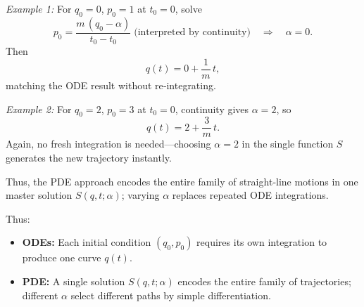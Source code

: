 \emph{Example 1:} For \(q_{0}=0\), \(p_{0}=1\) at \(t_{0}=0\), solve
\[
p_{0} = \frac{m\,(q_{0} - \alpha)}{t_{0}-t_{0}}
\;\text{(interpreted by continuity)}\quad\Longrightarrow\quad
\alpha = 0.
\]
Then
\[
q(t) = 0 + \frac{1}{m}\,t,
\]
matching the ODE result without re‐integrating.

\emph{Example 2:} For \(q_{0}=2\), \(p_{0}=3\) at \(t_{0}=0\), continuity gives \(\alpha=2\), so
\[
q(t) = 2 + \frac{3}{m}\,t.
\]
Again, no fresh integration is needed—choosing \(\alpha=2\) in the single function \(S\) generates the new trajectory instantly.

Thus, the PDE approach encodes the entire family of straight‐line motions in one master solution \(S(q,t;\alpha)\); varying \(\alpha\) replaces repeated ODE integrations.


\bigskip

Thus:
\begin{itemize}
  \item \textbf{ODEs:} Each initial condition \((q_{0},p_{0})\) requires its own integration to produce one curve \(q(t)\).  
  \item \textbf{PDE:} A single solution \(S(q,t;\alpha)\) encodes the entire family of trajectories; different \(\alpha\) select different paths by simple differentiation.  
\end{itemize}




